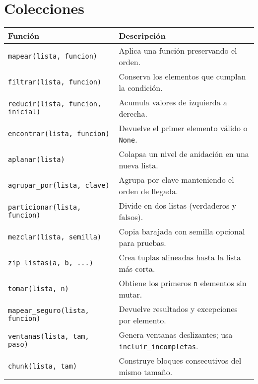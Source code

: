 \documentclass{article}
\begin{document}
\section*{Colecciones}
\begin{tabular}{ll}
\textbf{Función} & \textbf{Descripción}\\\hline
\texttt{mapear(lista, funcion)} & Aplica una función preservando el orden.\\
\texttt{filtrar(lista, funcion)} & Conserva los elementos que cumplan la condición.\\
\texttt{reducir(lista, funcion, inicial)} & Acumula valores de izquierda a derecha.\\
\texttt{encontrar(lista, funcion)} & Devuelve el primer elemento válido o \texttt{None}.\\
\texttt{aplanar(lista)} & Colapsa un nivel de anidación en una nueva lista.\\
\texttt{agrupar\_por(lista, clave)} & Agrupa por clave manteniendo el orden de llegada.\\
\texttt{particionar(lista, funcion)} & Divide en dos listas (verdaderos y falsos).\\
\texttt{mezclar(lista, semilla)} & Copia barajada con semilla opcional para pruebas.\\
\texttt{zip\_listas(a, b, ...)} & Crea tuplas alineadas hasta la lista más corta.\\
\texttt{tomar(lista, n)} & Obtiene los primeros \texttt{n} elementos sin mutar.\\
\texttt{mapear\_seguro(lista, funcion)} & Devuelve resultados y excepciones por elemento.\\
\texttt{ventanas(lista, tam, paso)} & Genera ventanas deslizantes; usa \texttt{incluir\_incompletas}.\\
\texttt{chunk(lista, tam)} & Construye bloques consecutivos del mismo tamaño.\\
\end{tabular}
\end{document}
